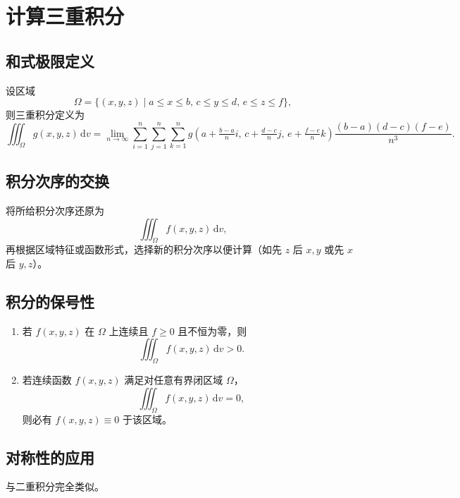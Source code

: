 \section{计算三重积分}

\subsection{和式极限定义}

设区域
\[
      \Omega = \{(x, y, z) \mid a \le x \le b,\, c \le y \le d,\, e \le z \le f\},
\]
则三重积分定义为
\[
      \iiint_{\Omega} g(x, y, z) \, \mathrm{d}v
      = \lim_{n \to \infty}
      \sum_{i=1}^{n} \sum_{j=1}^{n} \sum_{k=1}^{n}
      g\!\left(a + \tfrac{b-a}{n}i,\, c + \tfrac{d-c}{n}j,\, e + \tfrac{f-e}{n}k\right)
      \frac{(b-a)(d-c)(f-e)}{n^3}.
\]

\subsection{积分次序的交换}

将所给积分次序还原为
\[
      \iiint_\Omega f(x,y,z)\, \mathrm{d}v,
\]
再根据区域特征或函数形式，选择新的积分次序以便计算（如先 $z$ 后 $x,y$ 或先 $x$ 后 $y,z$）。

\subsection{积分的保号性}

\begin{enumerate}
      \item 若 $f(x,y,z)$ 在 $\Omega$ 上连续且 $f \ge 0$ 且不恒为零，则
            \[
                  \iiint_{\Omega} f(x,y,z)\, \mathrm{d}v > 0.
            \]
      \item 若连续函数 $f(x,y,z)$ 满足对任意有界闭区域 $\Omega$，
            \[
                  \iiint_{\Omega} f(x,y,z)\, \mathrm{d}v = 0,
            \]
            则必有 $f(x,y,z) \equiv 0$ 于该区域。
\end{enumerate}

\subsection{对称性的应用}

与二重积分完全类似。

